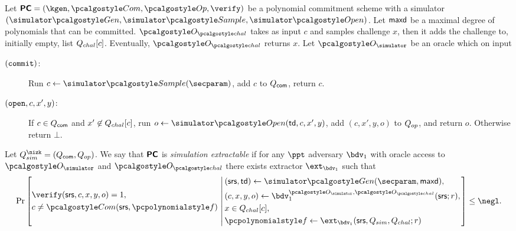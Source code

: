 \documentclass[runningheads,11pt]{llncs}
\begin{document}
\begin{definition}
  \label{def:se_bdv1}
  Let $\PCOM = (\kgen, \com, \op, \verify)$ be a polynomial commitment scheme with a
  simulator $(\simgen, \simsample, \simopen)$. Let $\mathsf{maxd}$ be a maximal degree of
  polynomials that can be committed. $\oraclec$ takes as input $c$ and samples
  challenge $x$, then it adds the challenge to, initially empty, list
  ${Q_{chal}}[c]$.  Eventually, $\oraclec$ returns $x$. Let $\oracles$ be an oracle which on input
     \begin{description}
     \item[$(\mathtt{commit})$:] Run $c \gets \simsample (\secparam)$, add $c$ to
       $Q_{\mathsf{com}}$, return $c$.
     \item[$(\mathtt{open}, c, x', y)$:] If $c \in Q_{\mathsf{com}}$ and $x' \not\in {Q_{chal}}[c]$, run
       $o \gets \simopen(\td, c, x', y)$, add $(c, x', y, o)$ to $Q_{op}$, and return
       $o$. Otherwise return $\bot$.
     \end{description}
     Let $\Qsim = (\Qcom, \Qop)$.  We say that $\bm{\mathsf{PC}}$ is \emph{simulation
       extractable} if for any $\ppt$ adversary $\bdv_1$ with oracle access to
     $\oracles$ and $\oraclec$ there exists extractor $\ext_{\bdv_1}$ such that
     \[
       \Pr \left[
         \begin{aligned}
           & \verify(\srs, c, x, y, o) = 1, \\
           & c \neq \com(\srs, \p{f})\\
         \end{aligned}
         \,\left|\, \vphantom{
             \begin{aligned}
               & \\
               & \\
               & \\
               &
             \end{aligned}
           }
           \begin{aligned}
             & (\srs, \td) \gets \simgen(\secparam, \maxdeg),\\
             & (c, x, y, o) \gets \bdv_1^{\oracles,\oraclec}(\srs; r), \\
             & x \in \Qchal[c], \\
             & \p{f} \gets \ext_{\bdv_1}(\srs, Q_{sim}, Q_{chal}; r)
           \end{aligned}
         \right.\right] \leq \negl.
\]
\end{definition}
\end{document}
